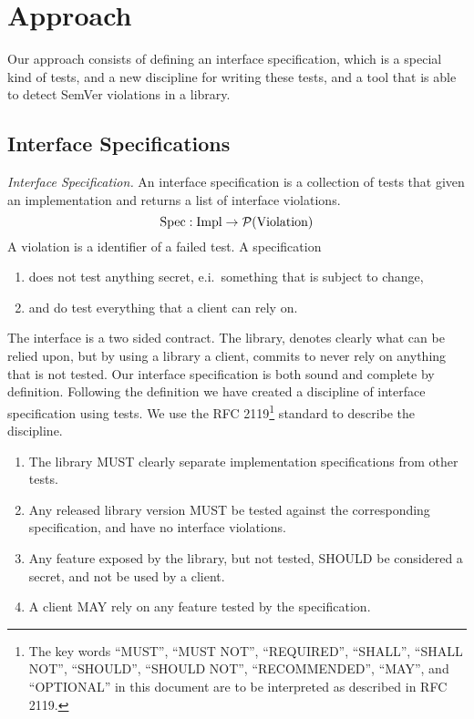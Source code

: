 \section{Approach}

Our approach consists of defining an interface specification, which is a
special kind of tests, and a new discipline for writing these tests, and a tool
that is able to detect SemVer violations in a library.

\subsection{Interface Specifications}

\begin{definition}\textit{Interface Specification.}
An interface specification is a collection of tests that given an
implementation and returns a list of interface violations. 
$$\text{Spec} : \text{Impl} \to \mathcal{P}(\text{Violation})$$
A violation is a identifier of a failed test. A specification
\begin{enumerate}
    \item does not test anything secret, e.i.\ something that is subject to change,
    \item and do test everything that a client can rely on.  
\end{enumerate}
\end{definition}

The interface is a two sided contract. The library, denotes clearly what can be
relied upon, but by using a library a client, commits to never rely on anything
that is not tested.  Our interface specification is both sound and complete by
definition.  Following the definition we have created a discipline of interface
specification using tests. We use the RFC 2119\footnote{The key words ``MUST'',
``MUST NOT'', ``REQUIRED'', ``SHALL'', ``SHALL NOT'', ``SHOULD'', ``SHOULD
NOT'', ``RECOMMENDED'',  ``MAY'', and ``OPTIONAL'' in this document are to be
interpreted as described in RFC 2119\cite{rfc2119}.} standard to describe the
discipline.

\begin{enumerate}
    \item The library MUST clearly separate implementation specifications from
    other tests.
    \item Any released library version MUST be tested against the corresponding
    specification, and have no interface violations.
    \item Any feature exposed by the library, but not tested, SHOULD be
    considered a secret, and not be used by a client.
    \item A client MAY rely on any feature tested by the specification.
\end{enumerate}


